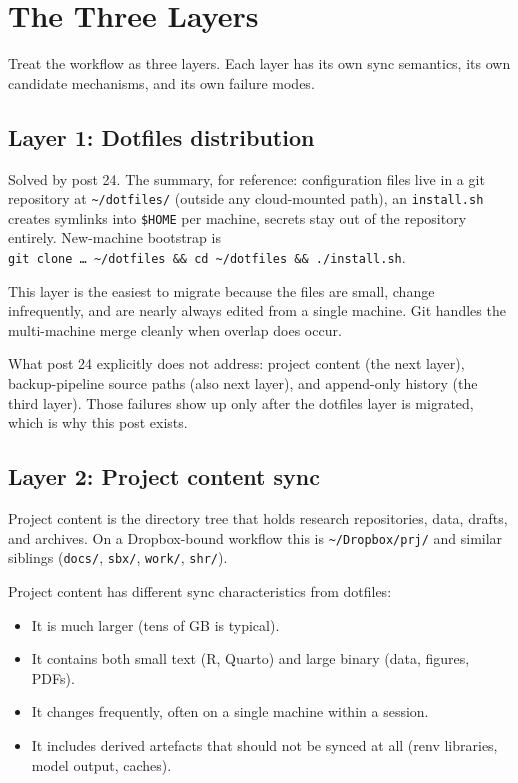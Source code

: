 \documentclass[
  11pt,
  letterpaper,
  DIV=11,
  numbers=noendperiod]{scrartcl}
\providecommand{\tightlist}{%
  \setlength{\itemsep}{0pt}\setlength{\parskip}{0pt}}\usepackage{longtable,booktabs,array}
\begin{document}
\section{The Three Layers}\label{the-three-layers}

Treat the workflow as three layers. Each layer has its own sync
semantics, its own candidate mechanisms, and its own failure modes.

\subsection{Layer 1: Dotfiles
distribution}\label{layer-1-dotfiles-distribution}

Solved by post 24. The summary, for reference: configuration files live
in a git repository at \texttt{\textasciitilde{}/dotfiles/} (outside any
cloud-mounted path), an \texttt{install.sh} creates symlinks into
\texttt{\$HOME} per machine, secrets stay out of the repository
entirely. New-machine bootstrap is
\texttt{git\ clone\ …\ \textasciitilde{}/dotfiles\ \&\&\ cd\ \textasciitilde{}/dotfiles\ \&\&\ ./install.sh}.

This layer is the easiest to migrate because the files are small, change
infrequently, and are nearly always edited from a single machine. Git
handles the multi-machine merge cleanly when overlap does occur.

What post 24 explicitly does not address: project content (the next
layer), backup-pipeline source paths (also next layer), and append-only
history (the third layer). Those failures show up only after the
dotfiles layer is migrated, which is why this post exists.

\subsection{Layer 2: Project content
sync}\label{layer-2-project-content-sync}

Project content is the directory tree that holds research repositories,
data, drafts, and archives. On a Dropbox-bound workflow this is
\texttt{\textasciitilde{}/Dropbox/prj/} and similar siblings
(\texttt{docs/}, \texttt{sbx/}, \texttt{work/}, \texttt{shr/}).

Project content has different sync characteristics from dotfiles:

\begin{itemize}
\tightlist
\item
  It is much larger (tens of GB is typical).
\item
  It contains both small text (R, Quarto) and large binary (data,
  figures, PDFs).
\item
  It changes frequently, often on a single machine within a session.
\item
  It includes derived artefacts that should not be synced at all (renv
  libraries, model output, caches).
\end{itemize}
\end{document}
